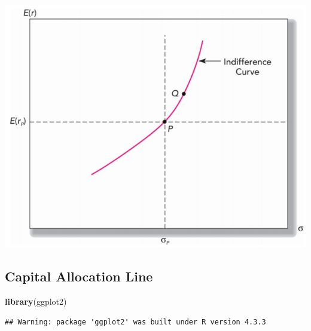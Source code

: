 \documentclass[
]{book}
\newenvironment{Shaded}{\begin{snugshade}}{\end{snugshade}}
\newcommand{\FunctionTok}[1]{\textcolor[rgb]{0.13,0.29,0.53}{\textbf{#1}}}
\newcommand{\NormalTok}[1]{#1}
\begin{document}
\includegraphics{Resources/indiffcurve.png}

\hypertarget{capital-allocation-line}{%
\subsection{Capital Allocation Line}\label{capital-allocation-line}}

\begin{Shaded}
\begin{Highlighting}[]
\FunctionTok{library}\NormalTok{(ggplot2)}
\end{Highlighting}
\end{Shaded}

\begin{verbatim}
## Warning: package 'ggplot2' was built under R version 4.3.3
\end{verbatim}
\end{document}
